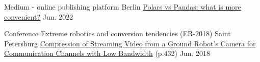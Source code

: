 

\begin{cventries}

  \cventryshort
    {Medium - online publishing platform}
    {Berlin}
    {\href{https://medium.com/@ilia.ozhmegov/polars-vs-pandas-what-is-more-convenient-331956742a69}{Polars vs Pandas: what is more convenient?} }
    {Jun. 2022}

  \cventryshort
    {Conference Extreme robotics and conversion tendencies (ER-2018)}
    {Saint Petersburg}
    {\href{https://er.rtc.ru/images/docs/Trudy_konf_ER-2018.pdf}{Compression of Streaming Video from a Ground Robot's Camera for Communication Channels with Low Bandwidth} (p.432)}
    {Jun. 2018}

\end{cventries}
